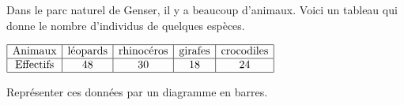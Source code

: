 \begin{corrige}
    \phantom{rrr}    

    \begin{minipage}{0.55\linewidth}
    Dans le parc naturel de Genser, il y a beaucoup d'animaux.
    Voici un tableau qui donne le nombre d'individus de quelques espèces.
    
    \medskip
    $
    \begin{array}{|c|c|c|c|c|}
    \hline
    \text{Animaux} & \text{léopards} & \text{rhinocéros} & \text{girafes} & \text{crocodiles}\\
    \hline
    \text{Effectifs} & 48 & 30 & 18 & 24\\
    \hline
    \end{array}
    $
   
    \medskip
    Représenter ces données par un diagramme en barres.
    \end{minipage}
    \begin{minipage}{0.4\linewidth}
    {\red
    }
\end{minipage}
\end{corrige}
